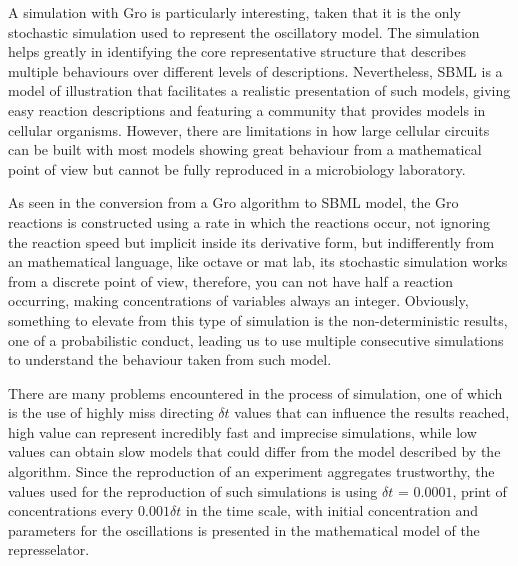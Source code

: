 \documentclass[12pt]{article}
\begin{document}
    
    A simulation with Gro is particularly interesting, taken that it is the only stochastic simulation used to represent the oscillatory model. The simulation helps greatly in identifying the core representative structure that describes multiple behaviours over different levels of descriptions. Nevertheless, SBML is a model of illustration that facilitates a realistic presentation of such models, giving easy reaction descriptions and featuring a community that provides models in cellular organisms. However, there are limitations in how large cellular circuits can be built with most models showing great behaviour from a mathematical point of view but cannot be fully reproduced in a microbiology laboratory.
    
    As seen in the conversion from a Gro algorithm to SBML model, the Gro reactions is constructed using a rate in which the reactions occur, not ignoring the reaction speed but implicit inside its derivative form, but indifferently from an mathematical language, like octave or mat lab, its stochastic simulation works from a discrete point of view, therefore, you can not have half a reaction occurring, making concentrations of variables always an integer. Obviously, something to elevate from this type of simulation is the non-deterministic results, one of a probabilistic conduct, leading us to use multiple consecutive simulations to understand the behaviour taken from such model.
    

    There are many problems encountered in the process of simulation, one of which is the use of highly miss directing $\delta{t}$ values that can influence the results reached, high value can represent incredibly fast and imprecise simulations, while low values can obtain slow models that could differ from the model described by the algorithm.\cite{Jang2012} Since the reproduction of an experiment aggregates trustworthy, the values used for the reproduction of such simulations is using $\delta{t}$ = $0.0001$, print of concentrations every $0.001\delta{t}$ in the time scale, with initial concentration and parameters for the oscillations is presented in the mathematical model of the represselator.
    
\end{document}
